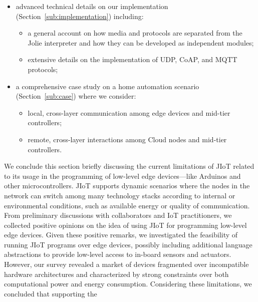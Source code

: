 \begin{itemize}
	\item advanced technical details on our implementation (Section~\ref{sub:implementation}) including:
	
	\begin{itemize}
	 	\item a general account on how media and protocols are separated from the
	 	Jolie interpreter and how they can be developed as independent modules;
	
		\item extensive details on the implementation of UDP, CoAP, and MQTT
		protocols;
	
	 \end{itemize}
 	
 	\item a comprehensive case study on a home automation scenario (Section~\ref{sub:case}) where we
 	consider:

 	\begin{itemize}
 		
 		\item local, cross-layer communication among edge devices and
 		mid-tier controllers;

 		\item remote, cross-layer interactions among Cloud nodes and mid-tier
 		controllers.

 	\end{itemize}

\end{itemize}
%
We conclude this section briefly discussing the current limitations of JIoT
related to its usage in the programming of low-level edge devices---like
Arduinos and other microcontrollers. JIoT supports dynamic scenarios where the
nodes in the network can switch among many technology stacks according to
internal or environmental conditions, such as available energy or quality of
communication. From preliminary discussions with collaborators and IoT
practitioners, we collected positive opinions on the idea of using JIoT for
programming low-level edge devices. Given these positive remarks, we
investigated the feasibility of running JIoT programs over edge devices,
possibly including additional language abstractions to provide low-level
access to in-board sensors and actuators. However, our survey revealed a
market of devices fragmented over incompatible hardware architectures and
characterized by strong constraints over both computational power and energy
consumption. Considering these limitations, we concluded that supporting the
